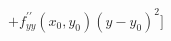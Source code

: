 \documentclass[preview]{standalone}
\begin{document}
\begin{align*}
+f_{y y}^{\prime \prime}(x_0, y_0)(y-y_0)^2]
\end{align*}
\end{document}
